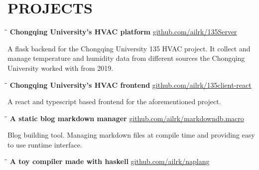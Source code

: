 \documentclass{res}
\begin{document}
\begin{resume}
\begin{itemize}[leftmargin=-.2in]
\end{itemize}

    \vspace{-0.2in}
\section{PROJECTS}

    \vspace{-0.1in}
    \begin{tabbing}
        \hspace{2.4in}\= \hspace{0.9in}\= \kill
        {\bf Chongqing University's HVAC platform} \>                   \>\url{github.com/ailrk/135Server}\\
    \end{tabbing}\vspace{-30pt}
    A flask backend for the Chongqing University 135 HVAC project. It collect and manage temperature and humidity data from
    different sources the Chongqing University worked with from 2019.

    \vspace{-0.2in}
    \begin{tabbing}
        \hspace{2.4in}\= \hspace{0.9in}\= \kill
        {\bf Chongqing University's HVAC frontend} \>                   \>\url{github.com/ailrk/135client-react}\\
    \end{tabbing}\vspace{-30pt}
    A react and typescript based frontend for the aforementioned project.

    \vspace{-0.2in}
    \begin{tabbing}
        \hspace{2.4in}\= \hspace{0.9in}\= \kill
        {\bf A static blog markdown manager} \>               \>\url{github.com/ailrk/markdowndb.macro}\\
    \end{tabbing}\vspace{-30pt}
    Blog building tool.
    Managing markdown files at compile time and providing easy to use runtime interface.

    \vspace{-0.2in}
    \begin{tabbing}
        \hspace{2.4in}\= \hspace{0.9in}\= \kill
        {\bf A toy compiler made with haskell} \>               \>\url{github.com/ailrk/naplang}\\


\end{tabbing}
\end{resume}
\end{document}
